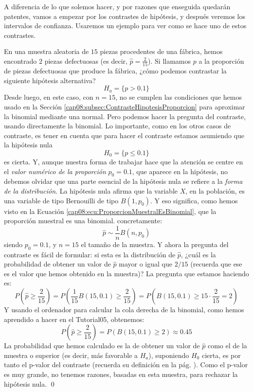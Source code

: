 A diferencia de lo que solemos hacer, y por razones que enseguida quedarán patentes, vamos a
empezar por los contrastes de hipótesis, y después veremos los intervalos de confianza. Usaremos un
ejemplo para ver como se hace uno de estos contrastes.
\begin{ejemplo}
\label{cap08:ejem:ContrasteHipotesisProporcionClopperPearson}
En una muestra aleatoria de $15$ piezas procedentes de una fábrica, hemos encontrado $2$ piezas
defectuosas (es decir, $\hat p=\frac{2}{15}$). Si llamamos $p$ a la proporción de piezas defectuosas que produce la fábrica, ¿cómo
podemos contrastar la siguiente hipótesis alternativa?
\[H_a=\{p>0.1\}\]
Desde luego, en este caso, con $n=15$, no se cumplen las condiciones que hemos usado en la Sección \ref{cap08:subsec:ContrasteHipotesisProporcion} para aproximar la binomial mediante una normal. Pero podemos hacer la pregunta del contraste, usando directamente la binomial. Lo importante, como en los otros casos de contraste, es tener en cuenta que para hacer el contraste estamos asumiendo que la hipótesis nula
\[H_0=\{p\leq 0.1\}\]
es cierta. Y, aunque nuestra forma de trabajar hace que la atención se centre en el {\em valor numérico de la proporción} $p_0=0.1$, que aparece en la hipótesis, no debemos olvidar que una parte esencial de la hipótesis nula se refiere a la {\em forma de la distribución}. La hipótesis nula afirma que la variable $X$, en la población, es una variable de tipo Bernouilli de tipo $B(1,p_0)$. Y eso significa, como hemos visto en la Ecuación \ref{cap08:ecu:ProporcionMuestralEsBinomial}, que la proporción muestral es una binomial. concretamente:
\[\hat p \sim \dfrac{1}{n}B(n,p_0)\]
siendo $p_0=0.1$, y $n=15$ el tamaño de la muestra.
Y ahora la pregunta del contraste es fácil de formular: si esta es la distribución de $\hat p$, ¿cuál es la probabilidad de obtener un valor de $\hat p$ mayor o igual que $2/15$ (recuerda que ese es el valor que hemos obtenido en la muestra)? La pregunta que estamos haciendo es:
    \[
        P\left(\hat p \geq \frac{2}{15}\right)= P\left(\dfrac{1}{15}B(15,0.1) \geq \frac{2}{15} \right)=
        P\left(B(15,0.1) \geq 15\cdot \frac{2}{15}=2\right)
    \]
Y usando el ordenador para calcular la cola derecha de la binomial, como hemos aprendido a hacer en el Tutorial05, obtenemos:
    \[
        P\left(\hat p \geq \frac{2}{15}\right)=P\left(B(15,0.1) \geq 2\right)\approx 0.45
    \]
La probabilidad que hemos calculado es la de obtener un valor de $\hat p$ como el de la muestra o superior (es decir, más favorable a $H_a$), suponiendo $H_0$ cierta, es por tanto el p-valor del contraste (recuerda su definición en la pág. \pageref{cap07:lugar:definicionPValor}). Como el p-valor es muy grande, no tenemos razones, basadas en esta muestra, para rechazar la hipótesis nula.
\qed
\end{ejemplo}
